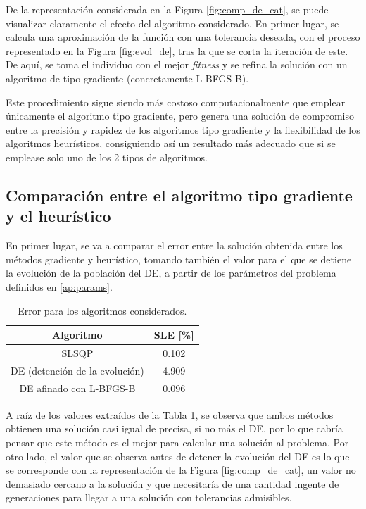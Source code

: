 De la representación considerada en la Figura \ref{fig:comp_de_cat}, se puede visualizar claramente el efecto del algoritmo considerado. En primer lugar, se calcula una aproximación de la función con una tolerancia deseada, con el proceso representado en la Figura \ref{fig:evol_de}, tras la que se corta la iteración de este. De aquí, se toma el individuo con el mejor \textit{fitness} y se refina la solución con un algoritmo de tipo gradiente (concretamente L-BFGS-B\cite{L-BFGS-B}). 

Este procedimiento sigue siendo más costoso computacionalmente que emplear únicamente el algoritmo tipo gradiente, pero genera una solución de compromiso entre la precisión y rapidez de los algoritmos tipo gradiente y la flexibilidad de los algoritmos heurísticos, consiguiendo así un resultado más adecuado que si se emplease solo uno de los 2 tipos de algoritmos.


\subsection{Comparación entre el algoritmo tipo gradiente y el heurístico} \label{ap:comp_alg}

En primer lugar, se va a comparar el error entre la solución obtenida entre los métodos gradiente y heurístico, tomando también el valor para el que se detiene la evolución de la población del DE, a partir de los parámetros del problema definidos en \ref{ap:params}.

\begin{table}[h]
    \centering
    \caption{Error para los algoritmos considerados.}
    \begin{tabular}{c c}
        \hline
        \textbf{Algoritmo} & \textbf{SLE} [\%] \\ \hline \hline   
        SLSQP & 0.102 \\ \hline
        DE (detención de la evolución) & 4.909 \\ \hline
        DE afinado con L-BFGS-B & 0.096 \\ \hline
    \end{tabular}
    \label{tab:error_algs}
\end{table}

A raíz de los valores extraídos de la Tabla \ref{tab:error_algs}, se observa que ambos métodos obtienen una solución casi igual de precisa, si no más el DE, por lo que cabría pensar que este método es el mejor para calcular una solución al problema. Por otro lado, el valor que se observa antes de detener la evolución del DE es lo que se corresponde con la representación de la Figura \ref{fig:comp_de_cat}, un valor no demasiado cercano a la solución y que necesitaría de una cantidad ingente de generaciones para llegar a una solución con tolerancias admisibles.

